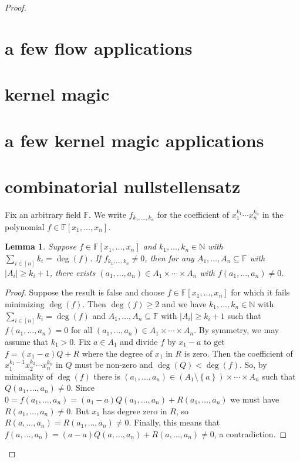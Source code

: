 \documentclass{amsbook}
\theoremstyle{plain}
\newtheorem{lemma}{Lemma}
\numberwithin{equation}{chapter}
\newcommand{\set}[1]{\left\{ #1 \right\}}
\newcommand{\card}[1]{\left|#1\right|}
\newcommand{\irange}[1]{\left[#1\right]}
\newcommand{\IN}{\mathbb{N}}
\begin{document}
\begin{proof}
\section*{a few flow applications}
\section*{kernel magic}
\section*{a few kernel magic applications}
\section*{combinatorial nullstellensatz}
Fix an arbitrary field $\mathbb{F}$. We write $f_{k_1, \ldots, k_n}$ for the coefficient of $x_1^{k_1}\cdots x_n^{k_n}$ in the polynomial $f \in \mathbb{F}[x_1, \ldots, x_n]$. 
\begin{lemma}
Suppose $f \in \mathbb{F}[x_1, \ldots, x_n]$ and $k_1, \ldots, k_n \in \IN$ with $\sum_{i \in \irange{n}} k_i = \deg(f)$.  If $f_{k_1, \ldots, k_n} \ne 0$, then for any $A_1, \ldots, A_n \subseteq \mathbb{F}$ with $\card{A_i} \ge k_i + 1$, there exists $(a_1, \ldots, a_n) \in A_1 \times \cdots \times A_n$ with $f(a_1, \ldots, a_n) \ne 0$.
\end{lemma}
\begin{proof}
Suppose the result is false and choose $f \in \mathbb{F}[x_1, \ldots, x_n]$ for which it fails 
minimizing $\deg(f)$. Then $\deg(f) \ge 2$ and we have $k_1, \ldots, k_n \in \IN$ with $\sum_{i \in \irange{n}} k_i = \deg(f)$ and 
$A_1, \ldots, A_n \subseteq \mathbb{F}$ with $\card{A_i} \ge k_i + 1$ such that $f(a_1, \ldots, a_n) = 0$ for all $(a_1, \ldots, a_n) \in A_1 \times \cdots \times A_n$.  
By symmetry, we may assume that $k_1 > 0$.  Fix $a \in A_1$ and divide $f$ by $x_1 - a$ to get $f = (x_1 - a)Q + R$ where the degree of $x_1$ in $R$ is zero.  
Then the coefficient of $x_1^{k_1-1}x_2^{k_2} \cdots x_n^{k_n}$ in $Q$ must be non-zero and $\deg(Q) < \deg(f)$.  So, by minimality of $\deg(f)$ there 
is $(a_1, \ldots, a_n) \in (A_1 \setminus \set{a}) \times \cdots \times A_n$ such that $Q(a_1,\ldots, a_n) \ne 0$.  
Since $0 = f(a_1,\ldots, a_n) = (a_1 - a)Q(a_1,\ldots, a_n) + R(a_1,\ldots, a_n)$ we must have $R(a_1,\ldots, a_n) \ne 0$.  
But $x_1$ has degree zero in $R$, so $R(a,\ldots, a_n) = R(a_1,\ldots, a_n) \ne 0$.  
Finally, this means that $f(a,\ldots, a_n) = (a-a)Q(a,\ldots, a_n) + R(a,\ldots, a_n) \ne 0$, a contradiction.
\end{proof}


\end{proof}
\end{document}
